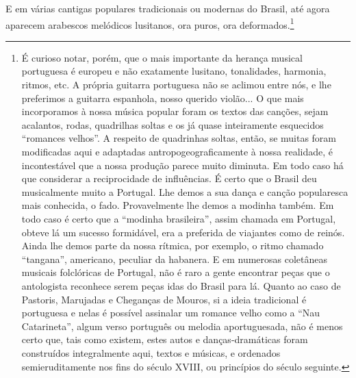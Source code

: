 E em várias cantigas populares tradicionais ou modernas do Brasil, até
agora aparecem arabescos melódicos lusitanos, ora puros, ora deformados.\footnote{É curioso notar, porém, que o mais importante da herança musical
portuguesa é europeu e não exatamente lusitano, tonalidades, harmonia,
ritmos, etc. A própria guitarra portuguesa não se aclimou entre nós, e
lhe preferimos a guitarra espanhola, nosso querido violão... O que mais
incorporamos à nossa música popular foram os textos das canções, sejam
acalantos, rodas, quadrilhas soltas e os já quase inteiramente
esquecidos ``romances velhos''. A respeito de quadrinhas soltas, então,
se muitas foram modificadas aqui e adaptadas antropogeograficamente à
nossa realidade, é incontestável que a nossa produção parece muito
diminuta. Em todo caso há que considerar a reciprocidade de influências.
É certo que o Brasil deu musicalmente muito a Portugal. Lhe demos a sua
dança e canção popularesca mais conhecida, o fado. Provavelmente lhe
demos a modinha também. Em todo caso é certo que a ``modinha
brasileira'', assim chamada em Portugal, obteve lá um sucesso
formidável, era a preferida de viajantes como de reinós. Ainda lhe demos
parte da nossa rítmica, por exemplo, o ritmo chamado ``tangana'',
americano, peculiar da habanera. E em numerosas coletâneas musicais
folclóricas de Portugal, não é raro a gente encontrar peças que o
antologista reconhece serem peças idas do Brasil para lá. Quanto ao caso
de Pastoris, Marujadas e Cheganças de Mouros, si a ideia tradicional é
portuguesa e nelas é possível assinalar um romance velho como a ``Nau
Catarineta'', algum verso português ou melodia aportuguesada, não é
menos certo que, tais como existem, estes autos e danças-dramáticas
foram construídos integralmente aqui, textos e músicas, e ordenados
semieruditamente nos fins do século XVIII, ou princípios do século
seguinte.}


